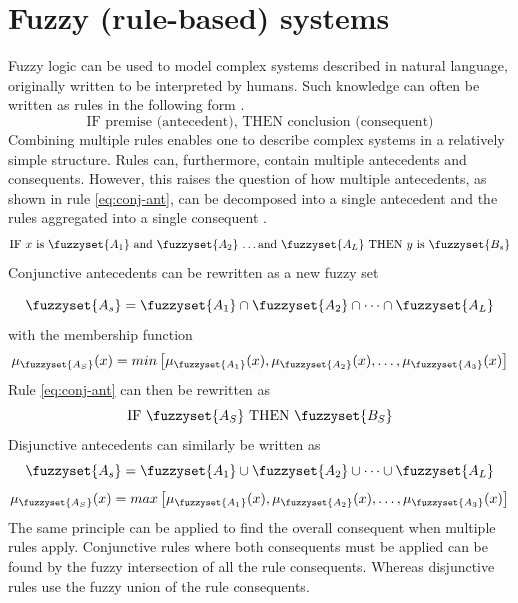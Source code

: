 \section{Fuzzy (rule-based) systems}
Fuzzy logic can be used to model complex systems described in natural language, originally written to be interpreted by humans. Such knowledge can often be written as rules in the following form \cite{ross2009fuzzy}.
\begin{equation}
    \text{IF premise (antecedent), THEN conclusion (consequent)}
\end{equation}
Combining multiple rules enables one to describe complex systems in a relatively simple structure. Rules can, furthermore, contain multiple antecedents and consequents. However, this raises the question of how multiple antecedents, as shown in rule \ref{eq:conj-ant}, can be  decomposed into a single antecedent and the rules aggregated into a single consequent \cite{ross2009fuzzy}.
\begin{equation}
    \text {IF $x$ is $\fuzzyset{A_1}$ and $\fuzzyset{A_2}$ \dots and $\fuzzyset{A_L}$ THEN $y$ is $\fuzzyset{B_s}$}
    \label{eq:conj-ant}
\end{equation}
Conjunctive antecedents can be rewritten as a new fuzzy set

\[ \fuzzyset{A_s}=\fuzzyset{A_1}\cap \fuzzyset{A_2} \cap \dots \cap \fuzzyset{A_L} \]
with the membership function
\[ \mu_{\fuzzyset{A_S}}(x)=min \left [\mu_{\fuzzyset{A_1}}(x),\mu_{\fuzzyset{A_2}}(x),\dots,\mu_{\fuzzyset{A_3}}(x) \right ] \]
Rule \ref{eq:conj-ant} can then be rewritten as
\[ \text{IF $\fuzzyset{A_S}$ THEN $\fuzzyset{B_S}$} \]
Disjunctive antecedents can similarly be written as
\[ \fuzzyset{A_s}=\fuzzyset{A_1}\cup \fuzzyset{A_2} \cup \dots \cup \fuzzyset{A_L} \]
\[ \mu_{\fuzzyset{A_S}}(x)=max \left [\mu_{\fuzzyset{A_1}}(x),\mu_{\fuzzyset{A_2}}(x),\dots,\mu_{\fuzzyset{A_3}}(x) \right ] \]
The same principle can be applied to find the overall consequent when multiple rules apply. Conjunctive rules where both consequents must be applied can be found by  the fuzzy intersection of all the rule consequents. Whereas disjunctive rules use the fuzzy union of the rule consequents.



